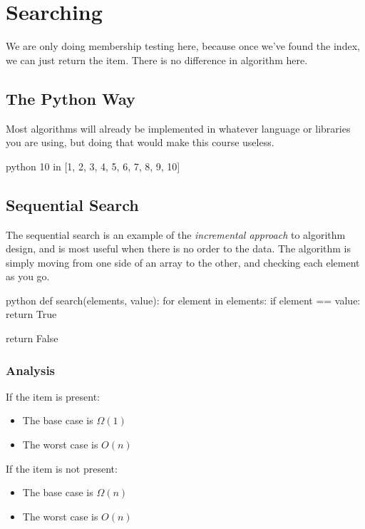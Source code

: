 \section{Searching}\label{sec:searching}

\begin{note}
    We are only doing membership testing here, because once we've found the index, we can just return the item.
    There is no difference in algorithm here.
\end{note}

\subsection{The Python Way}\label{sub:the_python_way}

Most algorithms will already be implemented in whatever language or libraries you are using, but doing that would make this course useless.

\begin{code}{python}
10 in [1, 2, 3, 4, 5, 6, 7, 8, 9, 10]
\end{code}

\subsection{Sequential Search}\label{sub:sequential_search}

The sequential search is an example of the \emph{incremental approach} to algorithm design, and is most useful when there is no order to the data.
The algorithm is simply moving from one side of an array to the other, and checking each element as you go.
\begin{code}{python}
    def search(elements, value):
        for element in elements:
            if element == value:
                return True
            
        return False
\end{code}

\subsubsection{Analysis}\label{ssub:sequntial_search_analysis}

If the item is present:
\begin{itemize}
    \item The base case is \(\Omega(1)\)
    \item The worst case is \(O(n)\)
\end{itemize}
If the item is not present:
\begin{itemize}
    \item The base case is \(\Omega(n)\)
    \item The worst case is \(O(n)\)
\end{itemize}


